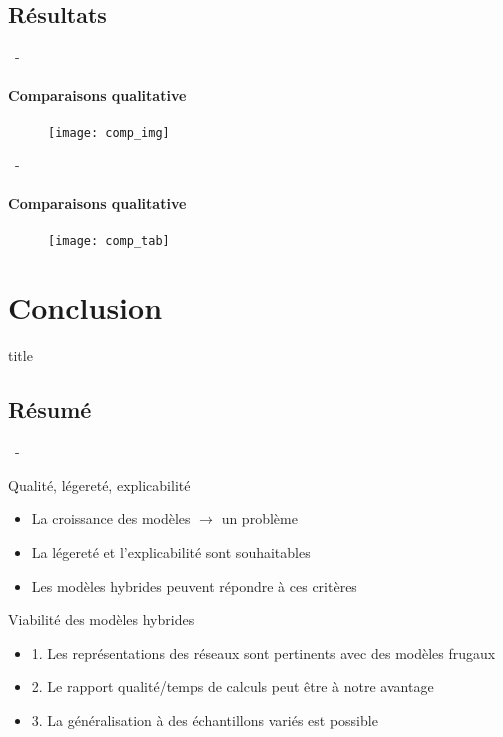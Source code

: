 \documentclass[aspectratio=169, 22pt]{beamer}
\begin{document}
\subsection{Résultats}
\begin{frame}{\secname~- \subsecname}
  \framesubtitle{Comparaisons qualitative}
  \begin{figure}
    \texttt{[image: comp\_img]}
  \end{figure}
\end{frame}

\begin{frame}{\secname~- \subsecname}
  \framesubtitle{Comparaisons qualitative}
  \begin{figure}
    \texttt{[image: comp\_tab]}
  \end{figure}
\end{frame}
\section{Conclusion}
\begin{frame}
  \begin{beamercolorbox}[sep=15pt,center,shadow=true,rounded=true]{title}
    \LARGE\bfseries \secname
  \end{beamercolorbox}
\end{frame}

\subsection{Résumé}
\begin{frame}{\secname~- \subsecname}
  \begin{customblock}{Qualité, légereté, explicabilité}
    \begin{itemize}
    \item La croissance des modèles $\rightarrow$ un problème
    \item La légereté et l'explicabilité sont souhaitables
    \item Les modèles hybrides peuvent répondre à ces critères
    \end{itemize}
  \end{customblock}

  \pause
  \begin{exampleblock}{Viabilité des modèles hybrides}
    \begin{itemize}  
    \item 1. Les représentations des réseaux sont pertinents avec des modèles frugaux
    \item 2. Le rapport qualité/temps de calculs peut être à notre avantage
    \item 3. La généralisation à des échantillons variés est possible
    \end{itemize}
  \end{exampleblock}
\end{frame}
\end{document}
